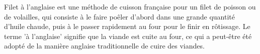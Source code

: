 Filet à l'anglaise est une méthode de cuisson française pour un filet de poisson ou de volailles, qui consiste à le faire poêler d'abord dans une grande quantité d'huile chaude, puis à le passer rapidement au four pour le finir en rôtissage. Le terme 'à l'anglaise' signifie que la viande est cuite au four, ce qui a peut-être été adopté de la manière anglaise traditionnelle de cuire des viandes.


